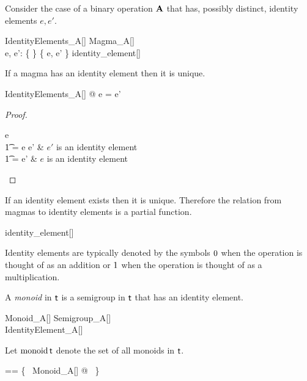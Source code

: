 \documentclass{amsart}
\begin{document}
Consider the case of a binary operation $\mathbf{A}$ that has, possibly distinct, identity elements $e, e'$.
\begin{schema}{IdentityElements\_A}[\genT]
	Magma\_A[\genT] \\
	e, e': \genT
\where
	\{ \strucA \} \cross \{ e, e' \} \subseteq identity\_element[\genT]
\end{schema}

\begin{remark}
If a magma has an identity element then it is unique.

\begin{zed}
	\forall IdentityElements\_A[\setT] @ e = e'
\end{zed}

\begin{proof}
\begin{argue}
e \\
\t1	= e \mulA e'	& $e'$ is an identity element \\
\t1	= e'			& $e$ is an identity element
\end{argue}
\end{proof}

\end{remark}

\begin{remark}
If an identity element exists then it is unique.
Therefore the relation from magmas to identity elements is a partial function.

\begin{zed}
identity\_element[\setT] \in \magma \setT \pfun \setT
\end{zed}

\end{remark}

Identity elements are typically denoted by the symbols  $0$ when the operation is thought of as an addition
or $1$ when the operation is thought of as a multiplication.

A {\em monoid} in $\mathsf{t}$ is a semigroup in $\mathsf{t}$ that has an identity element.
\begin{schema}{Monoid\_A}[\genT]
	Semigroup\_A[\genT] \\
	IdentityElement\_A[\genT]
\end{schema}

Let $\operatorname{monoid} \mathsf{t}$ denote the set of all monoids in $\mathsf{t}$.
\begin{zed}
	\monoid \genT == \{~ Monoid\_A[\genT] @ \strucA ~\}
\end{zed}
\end{document}
